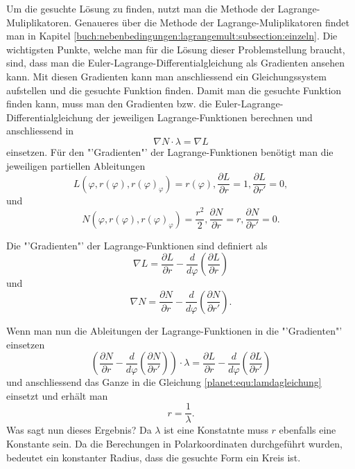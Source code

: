 Um die gesuchte Lösung zu finden, nutzt man die Methode der Lagrange-Muliplikatoren.
Genaueres über die Methode der Lagrange-Muliplikatoren findet man in Kapitel \ref{buch:nebenbedingungen:lagrangemult:subsection:einzeln}.
Die wichtigsten Punkte, welche man für die Lösung dieser Problemstellung braucht, sind, dass man die Euler-Lagrange-Differentialgleichung als Gradienten ansehen kann.
Mit diesen Gradienten kann man anschliessend ein Gleichungssystem aufstellen und die gesuchte Funktion finden.
Damit man die gesuchte Funktion finden kann, muss man den Gradienten bzw. die Euler-Lagrange-Differentialgleichung der jeweiligen Lagrange-Funktionen berechnen und anschliessend in
\begin{equation}
	\nabla N \cdot \lambda = \nabla L
	\label{planet:equ:lamdagleichung}
\end{equation}
einsetzen.
Für den "'Gradienten"' der Lagrange-Funktionen benötigt man die jeweiligen partiellen Ableitungen
\begin{equation*}
	L(\varphi ,r(\varphi),r(\varphi)_\varphi) = r(\varphi),
	\frac{\partial L}{\partial r} = 1,
	\frac{\partial L}{\partial r'} = 0,
\end{equation*}
und
\begin{equation*}
	N(\varphi ,r(\varphi),r(\varphi)_\varphi) = \frac{r^2}{2} ,
	\frac{\partial N}{\partial r} = r,
	\frac{\partial N}{\partial r'} = 0.
\end{equation*}

Die "'Gradienten"' der Lagrange-Funktionen sind definiert als 
\begin{equation*}
	\nabla L = 
	\frac{\partial L}{\partial r}-  \frac{d}{d\varphi}\left( \frac{\partial L}{\partial r} \right)
\end{equation*}
und
\begin{equation*}
	\nabla N = \frac{\partial N}{\partial r} - \frac{d}{d\varphi}\left(\frac{\partial N}{\partial r'}\right).
\end{equation*}

Wenn man nun die Ableitungen der Lagrange-Funktionen in die "'Gradienten"' einsetzen
\begin{equation*}
	\left(\frac{\partial N}{\partial r} - \frac{d}{d\varphi}\left(\frac{\partial N}{\partial r'}\right)\right)\cdot \lambda = \frac{\partial L}{\partial r}-  \frac{d}{d\varphi}\left( \frac{\partial L}{\partial r'} \right)
\end{equation*} 
und anschliessend das Ganze in die Gleichung \eqref{planet:equ:lamdagleichung}
einsetzt und erhält man
\begin{equation*}
	r = \frac{1}{\lambda}.
\end{equation*}
Was sagt nun dieses Ergebnis?
Da \(\lambda\) ist eine Konstatnte muss \(r\) ebenfalls eine Konstante sein.
Da die Berechungen in Polarkoordinaten durchgeführt wurden, bedeutet ein konstanter Radius, dass die gesuchte Form ein Kreis ist.

